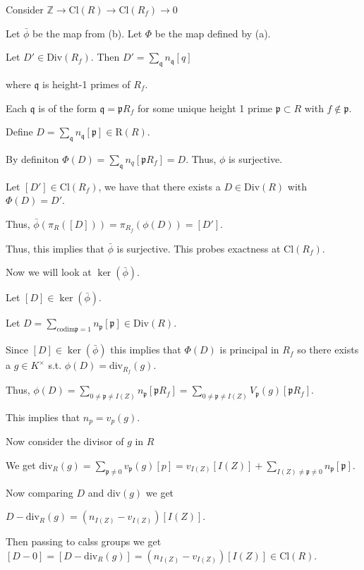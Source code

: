 \documentclass[12pt, letterpaper]{article}
\newcommand{\Z}{\mathbb{Z}}
\newcommand{\p}{\mathfrak{p}}
\newcommand{\mf}[1]{\mathfrak{#1}}
\newcommand{\codim}{\mathrm{codim}}
\begin{document}
\begin{subproblem}{}
    
\end{subproblem}
\begin{problemproof}
    Consider $\Z \to \mathrm{Cl}(R) \to \mathrm{Cl}(R_f) \to 0$

    Let $\bar{\phi}$ be the map from (b).
    Let $\Phi$ be the map defined by (a).

    Let $D' \in \mathrm{Div}(R_f)$. Then $D'= \sum_{\mf{q}} n_{\mf{q}}[q]$

    where $\mf{q}$ is height-1 primes of $R_f$.

    Each $\mf{q}$ is of the form $\mf{q} = \p R_f$ for some unique height 1 prime $\p \subset R$ with $f \notin \p$.

    Define $D = \sum_{\mf{q}} n_{\mf{q}}[\p] \in \mathrm{R}(R)$.

    By definiton $\Phi(D)=\sum_{\mf{q}} n_q[\p R_f] = D$. Thus, $\phi$ is surjective.

    Let $[D'] \in \mathrm{Cl}(R_f)$, we have that there exists a $D \in \mathrm{Div}(R)$ with $\Phi(D)=D'$.

    Thus, $\bar{\phi}(\pi_R([D]))=\pi_{R_f}(\phi(D))=[D']$.

    Thus, this implies that $\bar{\phi}$ is surjective. This probes exactness at $\mathrm{Cl}(R_f)$.

    Now we will look at $\ker(\bar{\phi})$.

    Let $[D] \in \ker(\bar{\phi})$.

    Let $D= \sum_{\codim \p = 1} n_\p [\p] \in \mathrm{Div}(R)$.

    Since $[D] \in \ker(\bar{\phi})$ this implies that $\Phi(D)$ is principal in $R_f$ so there exists a 
    $g \in K^\times$ s.t. $\phi(D)=\mathrm{div}_{R_f}(g)$.

    Thus, $\phi(D)=\sum_{0 \neq \p \neq I(Z)}n_\p [\p R_f]=\sum_{0 \neq \p \neq I(Z)} V_\p(g)[\p R_f]$.

    This implies that $n_p = v_p(g)$.

    Now consider the divisor of $g$ in $R$

    We get $\mathrm{div}_R(g)=\sum_{\p \neq 0}v_\p(g)[p] = v_{I(Z)}[I(Z)] + \sum_{I(Z) \neq \p \neq 0} n_\p[\p]$.

    Now comparing $D$ and $\mathrm{div}(g)$ we get

    $D-\mathrm{div}_R(g) = (n_{I(Z)} - v_{I(Z)})[I(Z)]$.

    Then passing to calss groups we get $[D-0]=[D-\mathrm{div}_R(g)]=(n_{I(Z)} - v_{I(Z)})[I(Z)] \in \mathrm{Cl}(R)$.


\end{problemproof}
\end{document}
